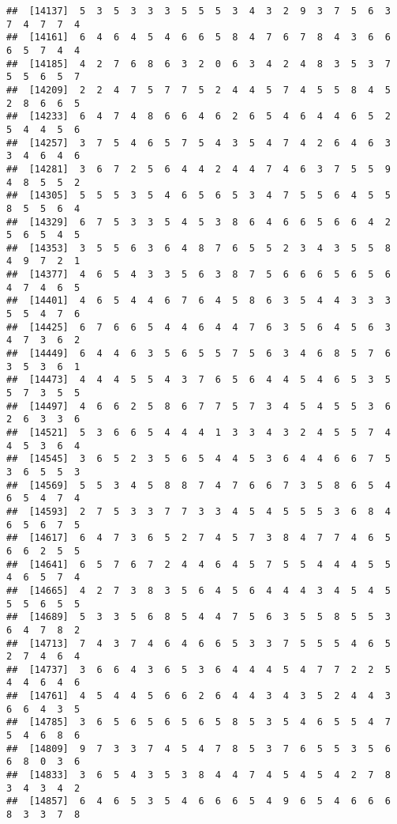 \documentclass[
]{book}
\begin{document}
\begin{verbatim}
##  [14137]  5  3  5  3  3  3  5  5  5  3  4  3  2  9  3  7  5  6  3  7  4  7  7  4
##  [14161]  6  4  6  4  5  4  6  6  5  8  4  7  6  7  8  4  3  6  6  6  5  7  4  4
##  [14185]  4  2  7  6  8  6  3  2  0  6  3  4  2  4  8  3  5  3  7  5  5  6  5  7
##  [14209]  2  2  4  7  5  7  7  5  2  4  4  5  7  4  5  5  8  4  5  2  8  6  6  5
##  [14233]  6  4  7  4  8  6  6  4  6  2  6  5  4  6  4  4  6  5  2  5  4  4  5  6
##  [14257]  3  7  5  4  6  5  7  5  4  3  5  4  7  4  2  6  4  6  3  3  4  6  4  6
##  [14281]  3  6  7  2  5  6  4  4  2  4  4  7  4  6  3  7  5  5  9  4  8  5  5  2
##  [14305]  5  5  5  3  5  4  6  5  6  5  3  4  7  5  5  6  4  5  5  8  5  5  6  4
##  [14329]  6  7  5  3  3  5  4  5  3  8  6  4  6  6  5  6  6  4  2  5  6  5  4  5
##  [14353]  3  5  5  6  3  6  4  8  7  6  5  5  2  3  4  3  5  5  8  4  9  7  2  1
##  [14377]  4  6  5  4  3  3  5  6  3  8  7  5  6  6  6  5  6  5  6  4  7  4  6  5
##  [14401]  4  6  5  4  4  6  7  6  4  5  8  6  3  5  4  4  3  3  3  5  5  4  7  6
##  [14425]  6  7  6  6  5  4  4  6  4  4  7  6  3  5  6  4  5  6  3  4  7  3  6  2
##  [14449]  6  4  4  6  3  5  6  5  5  7  5  6  3  4  6  8  5  7  6  3  5  3  6  1
##  [14473]  4  4  4  5  5  4  3  7  6  5  6  4  4  5  4  6  5  3  5  5  7  3  5  5
##  [14497]  4  6  6  2  5  8  6  7  7  5  7  3  4  5  4  5  5  3  6  2  6  3  3  6
##  [14521]  5  3  6  6  5  4  4  4  1  3  3  4  3  2  4  5  5  7  4  4  5  3  6  4
##  [14545]  3  6  5  2  3  5  6  5  4  4  5  3  6  4  4  6  6  7  5  3  6  5  5  3
##  [14569]  5  5  3  4  5  8  8  7  4  7  6  6  7  3  5  8  6  5  4  6  5  4  7  4
##  [14593]  2  7  5  3  3  7  7  3  3  4  5  4  5  5  5  3  6  8  4  6  5  6  7  5
##  [14617]  6  4  7  3  6  5  2  7  4  5  7  3  8  4  7  7  4  6  5  6  6  2  5  5
##  [14641]  6  5  7  6  7  2  4  4  6  4  5  7  5  5  4  4  4  5  5  4  6  5  7  4
##  [14665]  4  2  7  3  8  3  5  6  4  5  6  4  4  4  3  4  5  4  5  5  5  6  5  5
##  [14689]  5  3  3  5  6  8  5  4  4  7  5  6  3  5  5  8  5  5  3  6  4  7  8  2
##  [14713]  7  4  3  7  4  6  4  6  6  5  3  3  7  5  5  5  4  6  5  2  7  4  6  4
##  [14737]  3  6  6  4  3  6  5  3  6  4  4  4  5  4  7  7  2  2  5  4  4  6  4  6
##  [14761]  4  5  4  4  5  6  6  2  6  4  4  3  4  3  5  2  4  4  3  6  6  4  3  5
##  [14785]  3  6  5  6  5  6  5  6  5  8  5  3  5  4  6  5  5  4  7  5  4  6  8  6
##  [14809]  9  7  3  3  7  4  5  4  7  8  5  3  7  6  5  5  3  5  6  6  8  0  3  6
##  [14833]  3  6  5  4  3  5  3  8  4  4  7  4  5  4  5  4  2  7  8  3  4  3  4  2
##  [14857]  6  4  6  5  3  5  4  6  6  6  5  4  9  6  5  4  6  6  6  8  3  3  7  8

\end{verbatim}
\end{document}
